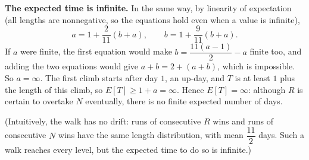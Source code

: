 \textbf{The expected time is infinite.} In the same way, by linearity of expectation (all lengths are nonnegative, so the equations hold even when a value is infinite),
\[a=1+\dfrac{2}{11}(b+a),\qquad b=1+\dfrac{9}{11}(b+a).\]
If $a$ were finite, the first equation would make $b=\dfrac{11(a-1)}{2}-a$ finite too, and adding the two equations would give $a+b=2+(a+b)$, which is impossible. So $a=\infty$. The first climb starts after day $1$, an up-day, and $T$ is at least $1$ plus the length of this climb, so $E[T]\ge1+a=\infty$. Hence $\boxed{E[T]=\infty}$: although $R$ is certain to overtake $N$ eventually, there is no finite expected number of days.

(Intuitively, the walk has no drift: runs of consecutive $R$ wins and runs of consecutive $N$ wins have the same length distribution, with mean $\dfrac{11}{2}$ days. Such a walk reaches every level, but the expected time to do so is infinite.)
